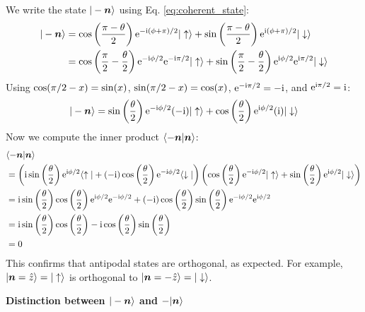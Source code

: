 We write the state $|-\bm{n}\rangle$ using Eq. \eqref{eq:coherent_state}:
\begin{equation}\begin{aligned}
    |-\bm{n}\rangle &= \cos\left(\frac{\mathrm{\pi}-\theta}{2}\right) \mathrm{e}^{-\mathrm{i}(\phi+\mathrm{\pi})/2} |\uparrow\rangle + \sin\left(\frac{\mathrm{\pi}-\theta}{2}\right) \mathrm{e}^{\mathrm{i}(\phi+\mathrm{\pi})/2} |\downarrow\rangle \\
    &= \cos\left(\frac{\mathrm{\pi}}{2}-\frac{\theta}{2}\right) \mathrm{e}^{-\mathrm{i}\phi/2} \mathrm{e}^{-\mathrm{i}\mathrm{\pi}/2} |\uparrow\rangle + \sin\left(\frac{\mathrm{\pi}}{2}-\frac{\theta}{2}\right) \mathrm{e}^{\mathrm{i}\phi/2} \mathrm{e}^{\mathrm{i}\mathrm{\pi}/2} |\downarrow\rangle
\end{aligned}\end{equation}
Using $\cos(\mathrm{\pi}/2 - x) = \sin(x)$, $\sin(\mathrm{\pi}/2 - x) = \cos(x)$, $\mathrm{e}^{-\mathrm{i}\mathrm{\pi}/2} = -\mathrm{i}$, and $\mathrm{e}^{\mathrm{i}\mathrm{\pi}/2} = \mathrm{i}$:
\begin{equation}
    |-\bm{n}\rangle = \sin\left(\frac{\theta}{2}\right) \mathrm{e}^{-\mathrm{i}\phi/2} (-\mathrm{i}) |\uparrow\rangle + \cos\left(\frac{\theta}{2}\right) \mathrm{e}^{\mathrm{i}\phi/2} (\mathrm{i}) |\downarrow\rangle
\end{equation}
Now we compute the inner product $\langle-\bm{n}|\bm{n}\rangle$:
\begin{equation}
    \begin{aligned}
    &\langle-\bm{n}|\bm{n}\rangle \\
    &=\left( \mathrm{i} \sin\left(\frac{\theta}{2}\right) \mathrm{e}^{\mathrm{i}\phi/2} 
    \langle\uparrow| + (-\mathrm{i}) \cos\left(\frac{\theta}{2}\right) \mathrm{e}^{-\mathrm{i}\phi/2} \langle\downarrow| \right)
    \left( \cos\left(\frac{\theta}{2}\right) \mathrm{e}^{-\mathrm{i}\phi/2} |\uparrow\rangle + \sin\left(\frac{\theta}{2}\right) \mathrm{e}^{\mathrm{i}\phi/2} |\downarrow\rangle \right) \\
    &= \mathrm{i} \sin\left(\frac{\theta}{2}\right)\cos\left(\frac{\theta}{2}\right) \mathrm{e}^{\mathrm{i}\phi/2}\mathrm{e}^{-\mathrm{i}\phi/2} + (-\mathrm{i}) \cos\left(\frac{\theta}{2}\right)\sin\left(\frac{\theta}{2}\right) \mathrm{e}^{-\mathrm{i}\phi/2}\mathrm{e}^{\mathrm{i}\phi/2} \\
    &= \mathrm{i} \sin\left(\frac{\theta}{2}\right)\cos\left(\frac{\theta}{2}\right) 
    - \mathrm{i} \cos\left(\frac{\theta}{2}\right)\sin\left(\frac{\theta}{2}\right) \\
    &= 0
    \end{aligned}
\end{equation}
This confirms that antipodal states are orthogonal, as expected. For example, $|\bm{n}=\hat{z}\rangle = |\uparrow\rangle$ is orthogonal to $|\bm{n}=-\hat{z}\rangle = |\downarrow\rangle$.

\textbf{Distinction between $|-\bm{n}\rangle$ and $-|\bm{n}\rangle$}

